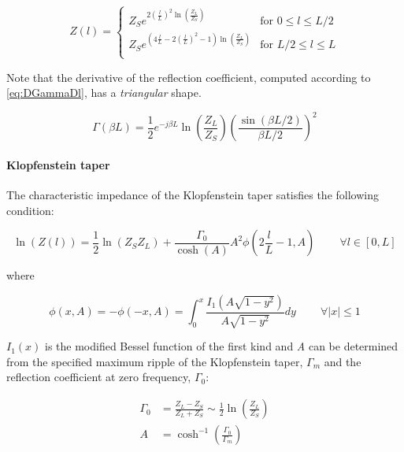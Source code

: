 \begin{equation}
Z(l) =
\begin{cases}
 Z_S e^{2(\frac{l}{L})^2 \ln \left( \frac{Z_L}{Z_S}\right)} & \text{for } 0 \leq l \leq L/2 \\
 Z_S e^{(4\frac{l}{L} - 2\left( \frac{l}{L} \right)^2 - 1) \ln \left( \frac{Z_L}{Z_S}\right)} & \text{for } L/2 \leq l \leq L \\
\end{cases}
\end{equation}

Note that the derivative of the reflection coefficient, computed according to \ref{eq:DGammaDl}, has a \textit{triangular} shape.

\begin{equation}
 \Gamma(\beta L) = \frac{1}{2} e^{-j\beta L} \ln \left( \frac{Z_L}{Z_S} \right) \left( \frac{\sin(\beta L/2)}{\beta L/2}\right)^{\! 2}
\end{equation}

\paragraph{Klopfenstein taper}

The characteristic impedance of the Klopfenstein taper satisfies the following condition:

\begin{equation}
\ln \left( Z(l) \right) = \frac{1}{2} \ln \left( Z_S Z_L\right) + \frac{\Gamma_0}{\cosh(A)} A^2 \phi (2\frac{l}{L} - 1, A) \;\;\;\;\;\;\;\; \forall l \in [0, L]
\end{equation}

\noindent where

\begin{equation}
  \phi(x, A) = -\phi(-x, A) = \int_0^x \frac{I_1 \left( A \sqrt{1 - y^2}\right)}{A \sqrt{1 - y^2}} dy \;\;\;\;\;\;\;\;\forall \mid x \mid \leq 1
\label{eq:phi_x_A}
\end{equation}

\noindent $I_1(x)$ is the modified Bessel function of the first kind and \textit{A} can be determined from the specified maximum ripple of the Klopfenstein taper, $\Gamma_m$ and the reflection coefficient at zero frequency, $\Gamma_0$:

\begin{align}
\Gamma_0 & = \frac{Z_L - Z_S}{Z_L + Z_S} \sim \frac{1}{2} \ln \left( \frac{Z_L}{Z_S}\right) \\
A & = \cosh^{-1}(\frac{\Gamma_0}{\Gamma_m})
\end{align}

